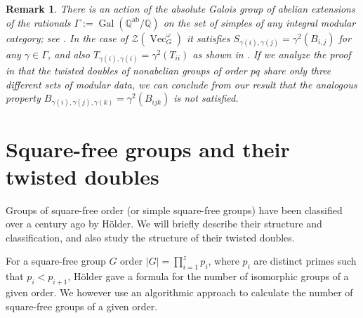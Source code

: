 \documentclass[11pt]{book}
\theoremstyle{Rem}
\newtheorem{Rem}[theorem]{Remark}
\theoremstyle{definition}
\numberwithin{equation}{section}
\newcommand\Vect{\operatorname{Vec}}
\newcommand\Q{\mathbb Q}
\newcommand\CTR{\mathcal Z}
\newcommand\Gal{\operatorname{Gal}}
\newcommand\ab{{\operatorname{ab}}}
\begin{document}
\begin{Rem}
  There is an action of the absolute Galois group of abelian extensions  of the rationals $\Gamma:=\Gal(\Q^\ab/\Q)$ on the set of simples of any integral modular category; see \cite[Appendix]{EtiNikOst:FC}. In the case of $\CTR(\Vect_G^\omega)$ it satisfies $S_{\gamma(i),\gamma(j)}=\gamma^2(B_{i,j})$ for any $\gamma\in\Gamma$, and also $T_{\gamma(i),\gamma(i)}=\gamma^2(T_{ii})$ as shown in  \cite{MR3435813}. If we analyze the proof in \cite{2017arXiv170802796M} that the twisted doubles of nonabelian groups of order $pq$ share only three different sets of modular data, we can conclude from our result that the analogous property $B_{\gamma(i),\gamma(j),\gamma(k)}=\gamma^2(B_{ijk})$ is not satisfied. 
\end{Rem}

\section{Square-free groups and their twisted doubles} %
\label{sub:twisted_doubles_of_square-free groups}
Groups of square-free order (or simple square-free groups) have been classified over a century ago by H\"older\cite{Hoelder1895}. We will briefly describe their structure and classification, and also study the structure of their twisted doubles.

For a square-free group $G$ order $|G| = \prod_{i=1}^z p_i$, where $p_i$ are distinct primes such that $p_i <p_{i+1}$, H\"older gave a formula for the number of isomorphic groups of a given order. We however use an algorithmic approach to calculate the number of square-free groups of a given order.\\ 
\end{document}
